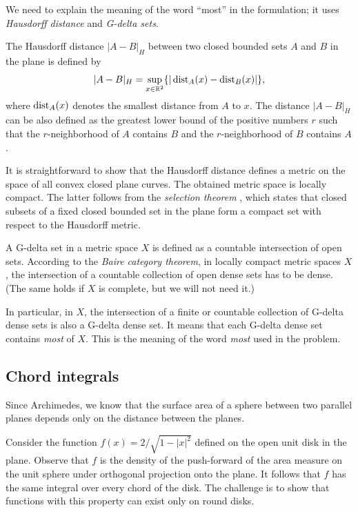 We need to explain the meaning of the word ``most'' in the formulation;
it uses \emph{Hausdorff distance} and \emph{G-delta sets}.

The Hausdorff distance $|A-B|_H$ between two closed bounded sets $A$ and $B$ in the plane is defined by 
\[|A-B|_H=\sup_{x\in\mathbb{R}^2}\{|\operatorname{\rm dist}\nolimits_A(x)-\operatorname{\rm dist}\nolimits_B(x)|\},\]
where $\operatorname{\rm dist}\nolimits_A(x)$ denotes the smallest distance from $A$ to $x$.
The distance $|A-B|_H$ can be also defined as the greatest lower bound of the positive numbers $r$ such that the $r$-neighborhood of $A$ contains $B$ and the $r$-neighborhood of $B$ contains $A$.

It is straightforward to show that the Hausdorff distance defines a metric on the space of all convex closed plane curves.
The obtained metric space is locally compact.
The latter follows from the \emph{selection theorem} \cite[see \S18 in][]{blaschke},
which states that closed subsets of a fixed closed bounded set in the plane form a compact set with respect to the Hausdorff metric. 

A G-delta set in a metric space $X$ is defined as a countable intersection of open sets.
According to the \emph{Baire category theorem}, 
in locally compact metric spaces $X$,
the intersection of a countable collection of open dense sets 
has to be dense.
(The same holds if $X$ is complete, but we will not need it.)

In particular, in $X$, 
the intersection of a finite or countable collection of G-delta dense sets is also a G-delta dense set. 
It means that each G-delta dense set contains {}\emph{most} of $X$.
This is the meaning of the word {}\emph{most} used in the problem.

\subsection*{Chord integrals}

Since  Archimedes, we know that the surface area of a sphere between two parallel planes depends only on the distance between the planes.

Consider the function $f(x) = 2/\sqrt{1 - |x|^2}$ defined on the open unit disk in the plane.
Observe that $f$ is the density of the push-forward of the area measure on the unit sphere under orthogonal projection onto the plane.
It follows that $f$ has the same integral over every chord of the disk.
The challenge is to show that functions with this property can exist only on round disks.

